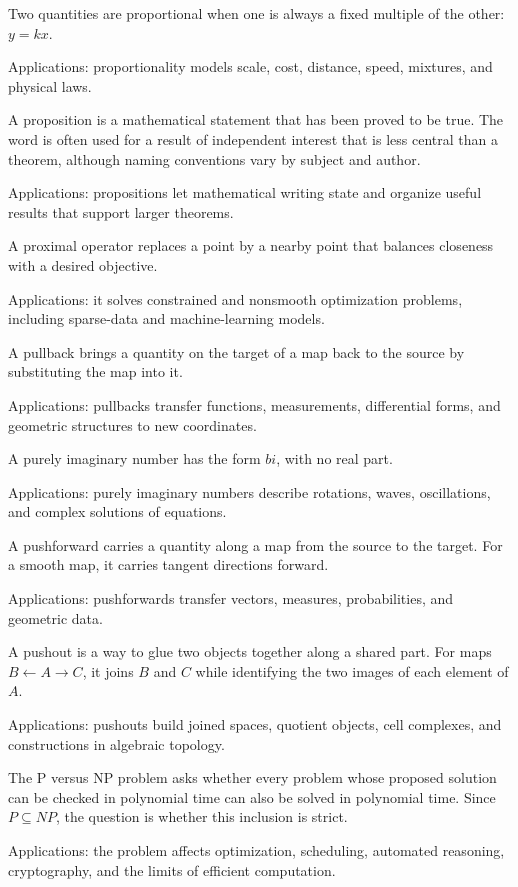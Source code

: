 Two quantities are proportional when one is always a fixed multiple of the other: $y=kx$. \par\noindent Applications: proportionality models scale, cost, distance, speed, mixtures, and physical laws.

A proposition is a mathematical statement that has been proved to be true. The word is often used for a result of independent interest that is less central than a theorem, although naming conventions vary by subject and author. \par\noindent Applications: propositions let mathematical writing state and organize useful results that support larger theorems.

A proximal operator replaces a point by a nearby point that balances closeness with a desired objective. \par\noindent Applications: it solves constrained and nonsmooth optimization problems, including sparse-data and machine-learning models.

A pullback brings a quantity on the target of a map back to the source by substituting the map into it. \par\noindent Applications: pullbacks transfer functions, measurements, differential forms, and geometric structures to new coordinates.

A purely imaginary number has the form $bi$, with no real part. \par\noindent Applications: purely imaginary numbers describe rotations, waves, oscillations, and complex solutions of equations.

A pushforward carries a quantity along a map from the source to the target. For a smooth map, it carries tangent directions forward. \par\noindent Applications: pushforwards transfer vectors, measures, probabilities, and geometric data.

A pushout is a way to glue two objects together along a shared part. For maps $B\leftarrow A\to C$, it joins $B$ and $C$ while identifying the two images of each element of $A$. \par\noindent Applications: pushouts build joined spaces, quotient objects, cell complexes, and constructions in algebraic topology.

The P versus NP problem asks whether every problem whose proposed solution can be checked in polynomial time can also be solved in polynomial time. Since $P\subseteq NP$, the question is whether this inclusion is strict. \par\noindent Applications: the problem affects optimization, scheduling, automated reasoning, cryptography, and the limits of efficient computation.
